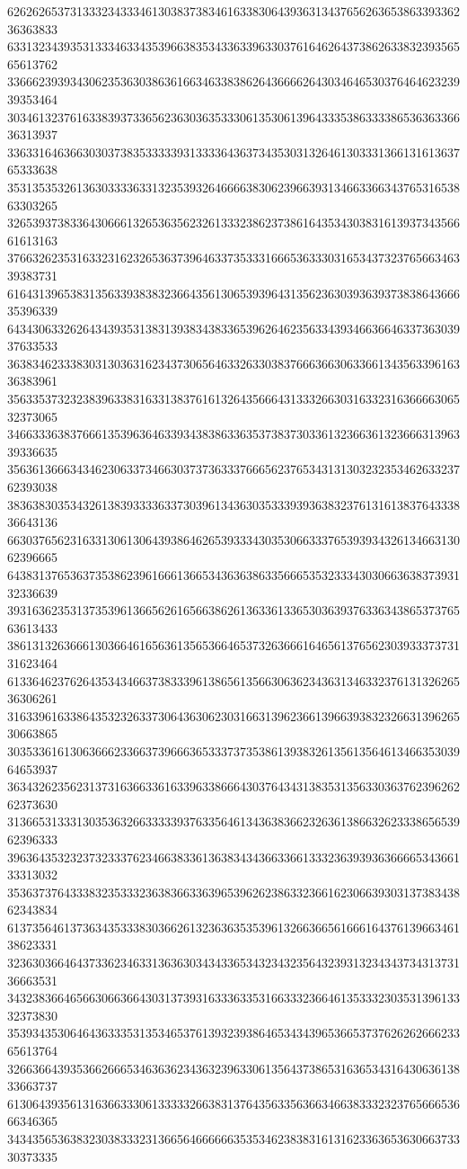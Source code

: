 62626265373133323433346130383738346163383064393631343765626365386339336236363833
63313234393531333463343539663835343363396330376164626437386263383239356565613762
33666239393430623536303863616634633838626436666264303464653037646462323939353464
30346132376163383937336562363036353330613530613964333538633338653636336636313937
33633164636630303738353333393133336436373435303132646130333136613161363765333638
35313535326136303333633132353932646666383062396639313466336634376531653863303265
32653937383364306661326536356232613332386237386164353430383161393734356661613163
37663262353163323162326536373964633735333166653633303165343732376566346339383731
61643139653831356339383832366435613065393964313562363039363937383864366635396339
64343063326264343935313831393834383365396264623563343934663664633736303937633533
36383462333830313036316234373065646332633038376663663063366134356339616336383961
35633537323238396338316331383761613264356664313332663031633231636666306532373065
34663336383766613539636463393438386336353738373033613236636132366631396339336635
35636136663434623063373466303737363337666562376534313130323235346263323762393038
38363830353432613839333363373039613436303533393936383237613161383764333836643136
66303765623163313061306439386462653933343035306633376539393432613466313062396665
64383137653637353862396166613665343636386335666535323334303066363837393132336639
39316362353137353961366562616566386261363361336530363937633634386537376563613433
38613132636661303664616563613565366465373263666164656137656230393337373131623464
61336462376264353434663738333961386561356630636234363134633237613132626536306261
31633961633864353232633730643630623031663139623661396639383232663139626530663865
30353361613063666233663739666365333737353861393832613561356461346635303964653937
36343262356231373163663361633963386664303764343138353135633036376239626262373630
31366531333130353632663333393763356461343638366232636138663262333865653962396333
39636435323237323337623466383361363834343663366133323639393636666534366133313032
35363737643338323533323638366336396539626238633236616230663930313738343862343834
61373564613736343533383036626132363635353961326636656166616437613966346138623331
32363036646437336234633136363034343365343234323564323931323434373431373136663531
34323836646566306636643031373931633363353166333236646135333230353139613332373830
35393435306464363335313534653761393239386465343439653665373762626266623365613764
32663664393536626665346363623436323963306135643738653163653431643063613833663737
61306439356131636633306133333266383137643563356366346638333232376566653666346365
34343565363832303833323136656466666635353462383831613162336365363066373330373335
